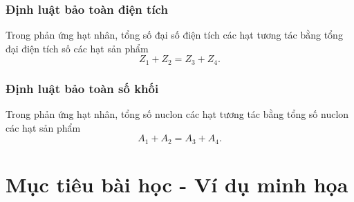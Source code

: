 \subsubsection{Định luật bảo toàn điện tích}
Trong phản ứng hạt nhân, tổng số đại số điện tích các hạt tương tác bằng tổng đại điện tích số các hạt sản phẩm
\begin{equation}
Z_1+Z_2=Z_3+Z_4.
\end{equation}
\subsubsection{Định luật bảo toàn số khối}
Trong phản ứng hạt nhân, tổng số nuclon các hạt tương tác bằng tổng số nuclon các hạt sản phẩm
\begin{equation}
A_1+A_2=A_3+A_4.
\end{equation}

\section{Mục tiêu bài học - Ví dụ minh họa}

